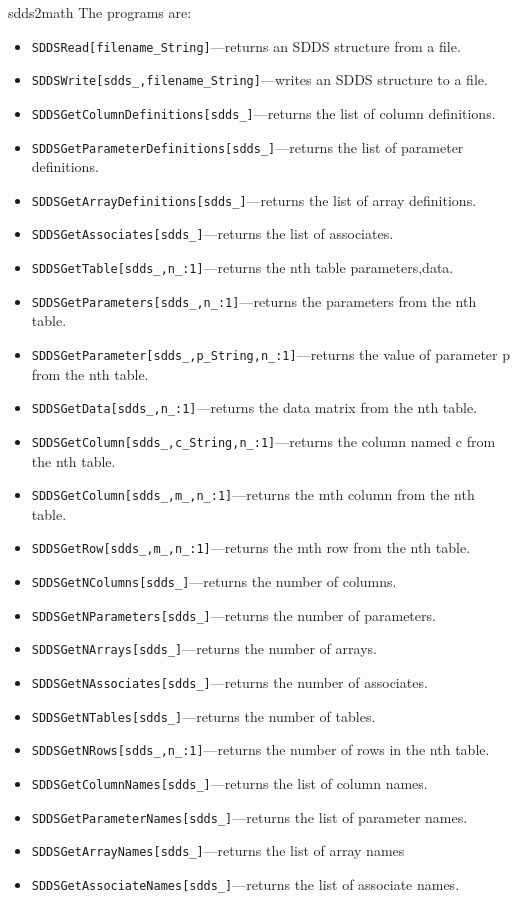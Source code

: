 \begin{sddsprog}{sdds2math}
  The programs are:
  \begin{itemize}
    \item \verb|SDDSRead[filename_String]|---returns an SDDS structure from a file.
    \item \verb|SDDSWrite[sdds_,filename_String]|---writes an SDDS structure to a file.
    \item \verb|SDDSGetColumnDefinitions[sdds_]|---returns the list of column definitions.
    \item \verb|SDDSGetParameterDefinitions[sdds_]|---returns the list of parameter definitions.
    \item \verb|SDDSGetArrayDefinitions[sdds_]|---returns the list of array definitions.
    \item \verb|SDDSGetAssociates[sdds_]|---returns the list of associates.
    \item \verb|SDDSGetTable[sdds_,n_:1]|---returns the nth table {parameters,data}.
    \item \verb|SDDSGetParameters[sdds_,n_:1]|---returns the parameters from the nth table.
    \item \verb|SDDSGetParameter[sdds_,p_String,n_:1]|---returns the value of parameter p from the nth table.
    \item \verb|SDDSGetData[sdds_,n_:1]|---returns the data matrix from the nth table.
    \item \verb|SDDSGetColumn[sdds_,c_String,n_:1]|---returns the column named c from the nth table.
    \item \verb|SDDSGetColumn[sdds_,m_,n_:1]|---returns the mth column from the nth table.
    \item \verb|SDDSGetRow[sdds_,m_,n_:1]|---returns the mth row from the nth table.
    \item \verb|SDDSGetNColumns[sdds_]|---returns the number of columns.
    \item \verb|SDDSGetNParameters[sdds_]|---returns the number of parameters.
    \item \verb|SDDSGetNArrays[sdds_]|---returns the number of arrays.
    \item \verb|SDDSGetNAssociates[sdds_]|---returns the number of associates.
    \item \verb|SDDSGetNTables[sdds_]|---returns the number of tables.
    \item \verb|SDDSGetNRows[sdds_,n_:1]|---returns the number of rows in the nth table.
    \item \verb|SDDSGetColumnNames[sdds_]|---returns the list of column names.
    \item \verb|SDDSGetParameterNames[sdds_]|---returns the list of parameter names.
    \item \verb|SDDSGetArrayNames[sdds_]|---returns the list of array names
    \item \verb|SDDSGetAssociateNames[sdds_]|---returns the list of associate names.
  \end{itemize}


\end{sddsprog}
